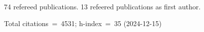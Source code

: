 74 refereed publications. 13 refeered publications as first author.

Total citations~=~4531; h-index~=~35 (2024-12-15)